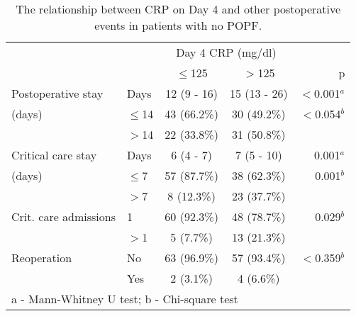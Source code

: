 \begin{table}[p]
	\centering
	\caption{The relationship between CRP on Day 4 and other postoperative events in patients with no POPF.}
	\label{table:crp_comp_CRP4_vs_LOS}
	\renewcommand{\arraystretch}{1.4} %
	\setlength{\tabcolsep}{9pt} %
	\begin{tabular}{|l l  c c r |}
		\hline
		                      &          &  \multicolumn{2}{c|}{Day 4 CRP (mg/dl)}   \\
		                      &          & $\leq$125   & $>$125       & p            \\ \hline
		Postoperative stay    & Days     & 12 (9 - 16) & 15 (13 - 26) & $<$0.001$^a$ \\
		(days)                & $\leq$14 & 43 (66.2\%) & 30 (49.2\%)  & $<$0.054$^b$ \\
		                      & $>$14    & 22 (33.8\%) & 31 (50.8\%)  &  \\
		Critical care stay    & Days     & 6 (4 - 7)   & 7 (5 - 10)   & 0.001$^a$    \\
		(days)                & $\leq$7  & 57 (87.7\%) & 38 (62.3\%)  & 0.001$^b$    \\
		                      & $>$7     & 8 (12.3\%)  & 23 (37.7\%)  &  \\
		Crit. care admissions & 1        & 60 (92.3\%) & 48 (78.7\%)  & 0.029$^b$    \\
		                      & $>$1     & 5 (7.7\%)   & 13 (21.3\%)  &  \\
		Reoperation           & No       & 63 (96.9\%) & 57 (93.4\%)  & $<$0.359$^b$ \\
		                      & Yes      & 2 (3.1\%)   & 4 (6.6\%)    &  \\ \hline
		\multicolumn{5}{l}{a - Mann-Whitney U test; b - Chi-square test}
	\end{tabular}
\end{table}



